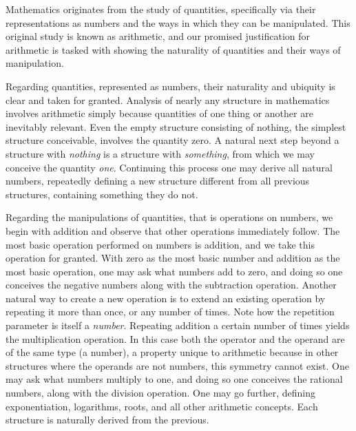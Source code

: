 Mathematics originates from the study of quantities, specifically via their representations as numbers and the ways in which they can be manipulated.
This original study is known as arithmetic, and our promised justification for arithmetic is tasked with showing the naturality of quantities and their ways of manipulation.

Regarding quantities, represented as numbers, their naturality and ubiquity is clear and taken for granted.
Analysis of nearly any structure in mathematics involves arithmetic simply because quantities of one thing or another are inevitably relevant.
Even the empty structure consisting of nothing, the simplest structure conceivable, involves the quantity zero.
A natural next step beyond a structure with \emph{nothing} is a structure with \emph{something}, from which we may conceive the quantity \emph{one}.
Continuing this process one may derive all natural numbers, repeatedly defining a new structure different from all previous structures, containing something they do not.

Regarding the manipulations of quantities, that is operations on numbers, we begin with addition and observe that other operations immediately follow.
The most basic operation performed on numbers is addition, and we take this operation for granted.
With zero as the most basic number and addition as the most basic operation, one may ask what numbers add to zero, and doing so one conceives the negative numbers along with the subtraction operation.
Another natural way to create a new operation is to extend an existing operation by repeating it more than once, or any number of times.
Note how the repetition parameter is itself a \emph{number}.
Repeating addition a certain number of times yields the multiplication operation.
In this case both the operator and the operand are of the same type (a number), a property unique to arithmetic because in other structures where the operands are not numbers, this symmetry cannot exist.
One may ask what numbers multiply to one, and doing so one conceives the rational numbers, along with the division operation.
One may go further, defining exponentiation, logarithms, roots, and all other arithmetic concepts.
Each structure is naturally derived from the previous.

